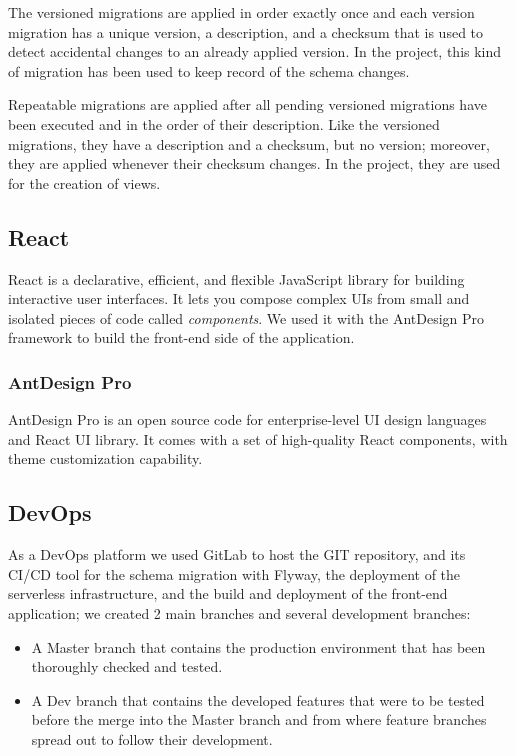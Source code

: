 The versioned migrations are applied in order exactly once and each version migration has a unique version, a description, and a checksum that is used to detect accidental changes to an already applied version. In the project, this kind of migration has been used to keep record of the schema changes.

Repeatable migrations are applied after all pending versioned migrations have been executed and in the order of their description. Like the versioned migrations, they have a description and a checksum, but no version; moreover, they are applied whenever their checksum changes. In the project, they are used for the creation of views.

\subsection{React}
React \cite{react} is a declarative, efficient, and flexible JavaScript library for building interactive user interfaces. It lets you compose complex UIs from small and isolated pieces of code called \textit{components}. We used it with the AntDesign Pro framework to build the front-end side of the application.

\subsubsection{AntDesign Pro}
AntDesign Pro \cite{ant} is an open source code for enterprise-level UI design languages and React UI library. It comes with a set of high-quality React components, with theme customization capability.


\subsection{DevOps}

As a DevOps platform we used GitLab to host the GIT repository, and its CI/CD tool for the schema migration with Flyway, the deployment of the serverless infrastructure, and the build and deployment of the front-end application; we created 2 main branches and several development branches:
\begin{itemize}
    \item A Master branch that contains the production environment that has been thoroughly checked and tested.
    \item A Dev branch that contains the developed features that were to be tested before the merge into the Master branch and from where feature branches spread out to follow their development. 
\end{itemize}

